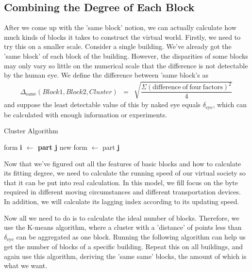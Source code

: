 \documentclass[12pt]{article}
\theoremstyle{definition}
\theoremstyle{remark}
\numberwithin{equation}{section}
\begin{document}
	\subsection{Combining the Degree of Each Block}
		After we come up with the 'same block' notion, we can actually calculate how much kinds of blocks it takes to construct the virtual world. Firstly, we need to try this on a smaller scale. Consider a single building. We've already got the 'same block' of each block of the building. However, the disparities of some blocks may only vary so little on the numerical scale that the difference is not detectable by the human eye. We define the difference between 'same block's as
		\begin{align}
		 \Delta_\mathrm{same}(Block1,Block2,Cluster)&=&\sqrt{\dfrac{\Sigma \left(\mathrm{difference\ of\ four\ factors}\right)^2}{4}}
		\end{align}
		 and suppose the least detectable value of this by naked eye equals $\delta_\mathrm{eye}$, which can be calculated with enough information or experiments. 
		 
		 \begin{algorithm}
		 \caption{Cluster Algorithm}
		 \label{nope}
		 \begin{algorithmic}
		 \STATE form \textbf{i{} $\leftarrow$ part \textbf{j}}
		 \ELSE
		 \STATE new form $\leftarrow$ part \textbf{j}
		 \ENDIF
		 \ENDFOR
		 \end{algorithmic}
		 \end{algorithm}
		 
		Now that we've figured out all the features of basic blocks and how to calculate its fitting degree, we need to calculate the running speed of our virtual society so that it can be put into real calculation. In this model, we fill focus on the byte required in different moving circumstances and different transportation devices. In addition, we will calculate its lagging index according to its updating speed.
		
		​Now all we need to do is to calculate the ideal number of blocks. Therefore, we use the K-means algorithm, where a cluster with a 'distance' of points less than $\delta_\mathrm{eye}$ can be aggregated as one block. Running the following algorithm can help us get the number of blocks of a specific building. Repeat this on all buildings, and again use this algorithm, deriving the 'same same' blocks, the amount of which is what we want.
	
\end{document}
